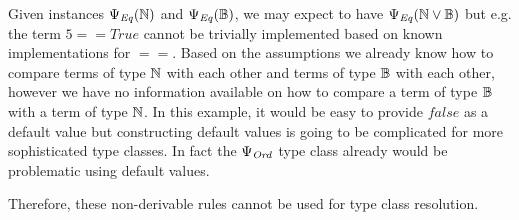 Given instances $\Psi_\mathit{Eq}(\mathbb{N})$ and $\Psi_\mathit{Eq}(\mathbb{B})$, we may expect to have $\Psi_\mathit{Eq}(\mathbb{N} \vee \mathbb{B})$ but e.g. the term $5 == True$ cannot be trivially implemented based on known implementations for $==$.
Based on the assumptions we already know how to compare terms of type $\mathbb{N}$ with each other and terms of type $\mathbb{B}$ with each other,
however we have no information available on how to compare a term of type $\mathbb{B}$ with a term of type $\mathbb{N}$.
In this example, it would be easy to provide $false$ as a default value but constructing default values is going to be complicated for more sophisticated type classes.
In fact the $\Psi_\mathit{Ord}$ type class already would be problematic using default values.

Therefore, these non-derivable rules cannot be used for type class resolution.







